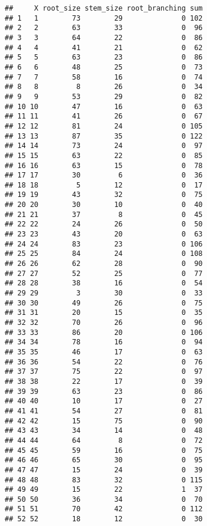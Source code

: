 \documentclass[
]{article}
\begin{document}
\begin{verbatim}
##     X root_size stem_size root_branching sum
## 1   1        73        29              0 102
## 2   2        63        33              0  96
## 3   3        64        22              0  86
## 4   4        41        21              0  62
## 5   5        63        23              0  86
## 6   6        48        25              0  73
## 7   7        58        16              0  74
## 8   8         8        26              0  34
## 9   9        53        29              0  82
## 10 10        47        16              0  63
## 11 11        41        26              0  67
## 12 12        81        24              0 105
## 13 13        87        35              0 122
## 14 14        73        24              0  97
## 15 15        63        22              0  85
## 16 16        63        15              0  78
## 17 17        30         6              0  36
## 18 18         5        12              0  17
## 19 19        43        32              0  75
## 20 20        30        10              0  40
## 21 21        37         8              0  45
## 22 22        24        26              0  50
## 23 23        43        20              0  63
## 24 24        83        23              0 106
## 25 25        84        24              0 108
## 26 26        62        28              0  90
## 27 27        52        25              0  77
## 28 28        38        16              0  54
## 29 29         3        30              0  33
## 30 30        49        26              0  75
## 31 31        20        15              0  35
## 32 32        70        26              0  96
## 33 33        86        20              0 106
## 34 34        78        16              0  94
## 35 35        46        17              0  63
## 36 36        54        22              0  76
## 37 37        75        22              0  97
## 38 38        22        17              0  39
## 39 39        63        23              0  86
## 40 40        10        17              0  27
## 41 41        54        27              0  81
## 42 42        15        75              0  90
## 43 43        34        14              0  48
## 44 44        64         8              0  72
## 45 45        59        16              0  75
## 46 46        65        30              0  95
## 47 47        15        24              0  39
## 48 48        83        32              0 115
## 49 49        15        22              1  37
## 50 50        36        34              0  70
## 51 51        70        42              0 112
## 52 52        18        12              0  30

\end{verbatim}
\end{document}
